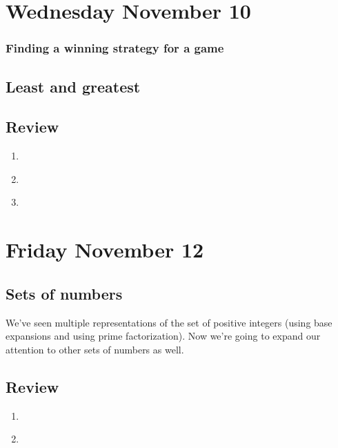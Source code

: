 \newpage
\section*{Wednesday November 10}

\subsubsection*{Finding a winning strategy for a game}

\newpage

\subsection*{Least and greatest}


\newpage
\subsection*{Review}
\begin{enumerate}
\item \hspace{1in}\\ 
\item \hspace{1in}\\ 
\item \hspace{1in}\\ 
\end{enumerate}

\newpage
\section*{Friday November 12}






\newpage
\subsection*{Sets of numbers}

We've seen multiple representations of the set of positive integers
(using base expansions and using prime factorization). Now we're 
going to expand our attention to other sets of numbers as well.




\newpage
\subsection*{Review}
\begin{enumerate}
\item \hspace{1in}\\ 
\newpage
\item \hspace{1in}\\ 
\end{enumerate}

